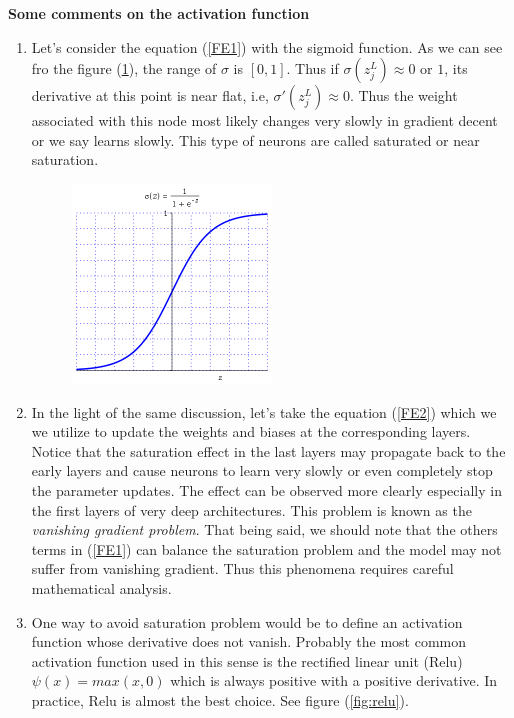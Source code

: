 \documentclass[12pt]{article}
\begin{document}
\newpage
\begin{flushleft}
\textbf{ Some comments on the activation function}
\begin{enumerate}
\item Let's consider the equation (\ref{FE1}) with the sigmoid function. As we can see fro the figure (\ref{fig:sigmo}), the range of $\sigma$ is $[0,1]$. Thus if $\sigma(z_{j}^{L})\approx 0$ or $1$, its derivative at this point is near flat, i.e, $\sigma'(z_{j}^{L})\approx 0 $. Thus the weight associated with this node most likely changes very slowly in gradient decent or we say learns slowly. This type of neurons are called saturated or near saturation. 
 \begin{figure}[H]
  \centering
  \includegraphics[width=0.5\textwidth]{sigmo.png}
  \label{fig:sigmo}
\end{figure}

\item In the light of the same discussion, let's take the equation (\ref{FE2}) which we we utilize to update the weights and biases at the corresponding layers. Notice that the saturation effect in the last layers may propagate back to the early layers and cause neurons to learn very slowly or even completely stop the parameter updates. The effect can be observed more clearly especially in the first layers of very deep architectures. This problem is known as the \textit{vanishing gradient problem}. That being said, we should note that the others terms in (\ref{FE1}) can balance the saturation problem and the model may not suffer from vanishing gradient. Thus this phenomena requires careful mathematical analysis.

\item One way to avoid saturation problem would be to define an activation function whose derivative does not vanish. Probably the most common activation function used in this sense is the rectified linear unit (Relu) $\psi(x)=max(x,0)$ which is always positive with a positive derivative. In practice, Relu is almost the best choice. See figure (\ref{fig:relu}).


\end{enumerate}
\end{flushleft}
\end{document}
